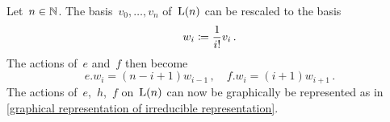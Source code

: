 \documentclass[a4paper, 11pt, oneside]{scrartcl}
\begin{document}
\begin{remark}
  Let~$n \in \mathbb{N}$.
  The basis~$v_0, \dotsc, v_n$ of~$\operatorname{L}(n)$ can be rescaled to the basis
  \[
    w_i
    \coloneqq
    \frac{1}{i!} v_i \,.
  \]
  The actions of~$e$ and~$f$ then become
  \[
    e.w_i = (n-i+1) w_{i-1} \,,
    \quad
    f.w_i = (i+1) w_{i+1} \,.
  \]
  The actions of~$e$,~$h$,~$f$ on~$\operatorname{L}(n)$ can now be graphically be represented as in \cref{graphical representation of irreducible representation}.
\end{remark}
\end{document}
